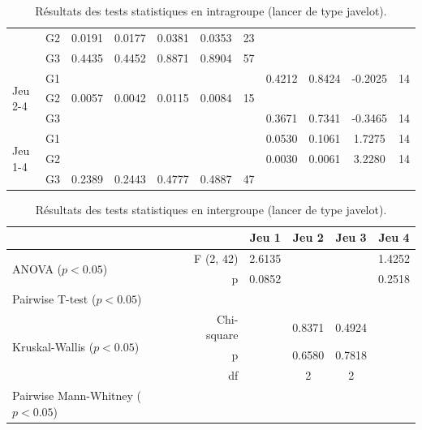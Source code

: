 {\begin{landscape}
\begin{table}[]
\begin{tabular}{ll|ccccc|cccc}
    & G2 & \cellcolor{green!25} 0.0191 & \cellcolor{green!25} 0.0177 & \cellcolor{green!25} 0.0381 & \cellcolor{green!25} 0.0353 & 23 &  &  &  &  \\
    & G3 & 0.4435 & 0.4452 & 0.8871 & 0.8904 & 57 &  &  &  &  \\ \hline
   \multirow{3}{*}{Jeu 2-4} & G1 &  &  &  &  &  & 0.4212 & 0.8424 & -0.2025 & 14 \\
    & G2 & \cellcolor{green!25} 0.0057 & \cellcolor{green!25} 0.0042 & \cellcolor{green!25} 0.0115 & \cellcolor{green!25} 0.0084 & 15 &  &  &  &  \\
    & G3 &  &  &  &  &  & 0.3671 & 0.7341 & -0.3465 & 14 \\ \hline
   \multirow{3}{*}{Jeu 1-4} & G1 &  &  &  &  &  & 0.0530 & 0.1061 & 1.7275 & 14 \\
    & G2 &  &  &  &  &  & \cellcolor{green!25} 0.0030 & \cellcolor{green!25} 0.0061 & 3.2280 & 14 \\
    & G3 & 0.2389 & 0.2443 & 0.4777 & 0.4887 & 47 &  &  &  &
   \end{tabular}
\caption{Résultats des tests statistiques en intragroupe (lancer de type javelot).}
\label{tab:javelin_intra}
\end{table}
\end{landscape}}

\begin{table}[]
    \begin{tabular}{lr|cccc}
        &  & Jeu 1 & Jeu 2 & Jeu 3 & Jeu 4 \\ \hline
       \multirow{2}{*}{ANOVA ($p < 0.05$)} & F (2, 42) & 2.6135 &  &  & 1.4252 \\
        & p & 0.0852 &  &  & 0.2518 \\ \hline
       \multirow{3}{*}{Pairwise T-test ($p < 0.05$)} &  &  &  &  &  \\
        &  &  &  &  &  \\
        &  &  &  &  &  \\ \hline
       \multirow{3}{*}{Kruskal-Wallis ($p < 0.05$)} & Chi-square &  & 0.8371 & 0.4924 &  \\
        & p &  & 0.6580 & 0.7818 &  \\
        & df &  & 2 & 2 &  \\ \hline
       \multirow{3}{*}{Pairwise Mann-Whitney ($p < 0.05$)} &  &  &  &  &  \\
        &  &  &  &  &  \\
        &  &  &  &  &
    \end{tabular}
\caption{Résultats des tests statistiques en intergroupe (lancer de type javelot).}
\label{tab:javelin_inter}
\end{table}


